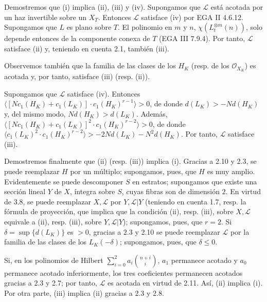 Demostremos que (i) implica (ii), (iii) y (iv). Supongamos que $\mathcal L$
está acotada por un haz invertible sobre un $X_T$. Entonces $\mathcal L$
satisface (iv) por EGA II 4.6.12. Supongamos que $L$ es plano sobre $T$. El
polinomio en $m$ y $n$, $\chi(L_t^{\otimes m}(n))$, solo depende entonces de
la componente conexa de $T$ (EGA III 7.9.4). Por tanto, $\mathcal L$
satisface (ii) y, teniendo en cuenta 2.1, también (iii).

Observemos también que la familia de las clases de los $H_K$ (resp. de los
$\mathcal O_{X_K}$) es acotada y, por tanto, satisface (iii) (resp. (ii)).

Supongamos que $\mathcal L$ satisface (iv). Entonces
$\langle[Nc_1(H_K)+c_1(L_K)]\cdot c_1(H_K)^{r-1}\rangle>0$, de donde
$d(L_K)>-Nd(H_K)$ y, del mismo modo, $Nd(H_K)>d(L_K)$. Además,
$\langle[Nc_1(H_K)+c_1(L_K)]^2\cdot c_1(H_K)^{r-2}\rangle>0$, de donde
$\langle c_1(L_K)^2\cdot c_1(H_K)^{r-2}\rangle>
-2Nd(L_K)-N^2d(H_K)$. Por tanto, $\mathcal L$ satisface (iii).

Demostremos finalmente que (ii) (resp. (iii)) implica (i). Gracias a 2.10 y
2.3, se puede reemplazar $H$ por un múltiplo; supongamos, pues, que $H$ es
muy amplio. Evidentemente se puede descomponer $S$ en estratos; supongamos
que existe una sección lineal $Y$ de $X$, íntegra sobre $S$, cuyas fibras
son de dimensión $2$. En virtud de 3.8, se puede reemplazar
$X,\mathcal L$ por $Y,\mathcal L|Y$ (teniendo en cuenta 1.7, resp. la fórmula
de proyección, que implica que la condición (ii), resp. (iii), sobre
$X,\mathcal L$ equivale a (ii), resp. (iii), sobre $Y,\mathcal L|Y$);
supongamos, pues, que $r=2$. Si
$\delta=\sup\{d(L_K)\}$ es $>0$, gracias a 2.3 y 2.10 se puede reemplazar
$\mathcal L$ por la familia de las clases de los $L_K(-\delta)$;
supongamos, pues, que $\delta\leq0$.

Si, en los polinomios de Hilbert
$\sum_{i=0}^{2}a_i\binom{n+i}{i}$, $a_1$ permanece acotado y $a_0$
permanece acotado inferiormente, los tres coeficientes permanecen acotados
gracias a 2.3 y 2.7; por tanto, $\mathcal L$ es acotada en virtud de 2.11.
Así, (ii) implica (i). Por otra parte, (iii) implica (ii) gracias a 2.3 y
2.8.
